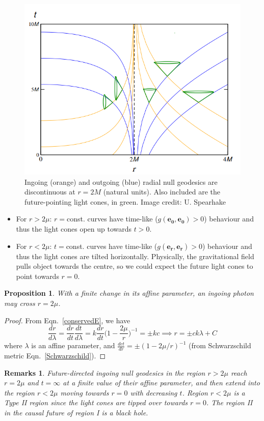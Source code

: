 \documentclass[a4paper]{article}
\newtheorem{remarks}{Remarks}[section]
\theoremstyle{new}
\newtheorem{prop}{Proposition}[section]
\begin{document}
\begin{figure}[H]
    \centering
    \includegraphics[scale=0.5]{radialnull.PNG}
    \caption{Ingoing (orange) and outgoing (blue) radial null geodesics are discontinuous at $r=2M$ (natural units). Also included are the future-pointing light cones, in green. Image credit: U. Spearhake}
\end{figure}
\begin{itemize}
\item For $r>2\mu$: $r=$const. curves have time-like ($g(\mathbf{e_0},\mathbf{e_0})>0$) behaviour and thus the light cones open up towards $t>0$.
\item For $r<2\mu$: $t=$const. curves have time-like ($g(\mathbf{e_r},\mathbf{e_r})>0$) behaviour and thus the light cones are tilted horizontally. Physically, the gravitational field pulls object towards the centre, so we could expect the future light cones to point towards $r=0$.
\end{itemize}
\begin{prop}
With a finite change in its affine parameter, an ingoing photon may cross $r=2\mu$.
\end{prop}
\begin{proof}
From Eqn.~\ref{conservedE}, we have 
$$\frac{dr}{d\lambda}=\frac{dr}{dt}\frac{dt}{d\lambda}=k\frac{dr}{dt}\bigg(1-\frac{2\mu}{r}\bigg)^{-1}=\pm kc\implies r=\pm ck\lambda+C$$
where $\lambda$ is an affine parameter, and $\frac{dct}{dr}=\pm(1-2\mu/r)^{-1}$ (from Schwarzschild metric Eqn.~\ref{Schwarzschild}).
\end{proof}
\begin{remarks}
Future-directed ingoing null geodesics in the region $r>2\mu$ reach $r=2\mu$ and $t=\infty$ at a finite value of their affine parameter, and then extend into the region $r<2\mu$ moving towards $r=0$ with decreasing $t$. Region $r<2\mu$ is a Type II region since the light cones are tipped over towards $r=0$. The region II in the causal future of region I is a black hole.
\end{remarks}
\end{document}
